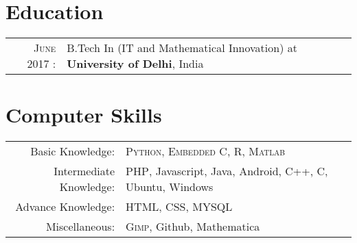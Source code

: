 \documentclass[a4paper,10pt]{article}
\begin{document}
\section{Education}
\begin{tabular}{rl}	
\textsc{June} 2017 :& B.Tech In (IT and Mathematical Innovation) at \textbf{University of Delhi}, India\\
\end{tabular}


\section{Computer Skills}
\begin{tabular}{rl}
Basic Knowledge:& \textsc{Python}, \textsc{Embedded C}, \textsc{R}, \textsc{Matlab} \setmainfont[SmallCapsFont=Fontin-SmallCaps.otf]{Fontin.otf}\\
Intermediate Knowledge:& \textsc{PHP}, Javascript, Java, Android,  C++, C, Ubuntu, Windows\\
Advance Knowledge:& \textsc{HTML}, CSS, MYSQL\\
Miscellaneous:& \textsc{Gimp}, Github,  Mathematica \\
\end{tabular}

\end{document}
